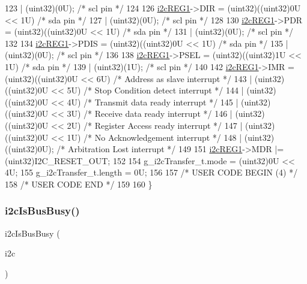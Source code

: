 \begin{DoxyCode}
123                   | (uint32)(0U);     \textcolor{comment}{/* scl pin */}
124 
126     \mbox{\hyperlink{reg__i2c_8h_a54937525fe89322407ede2bc3a5d0e4c}{i2cREG1}}->DIR  = (uint32)((uint32)0U << 1U)     \textcolor{comment}{/* sda pin */}
127                   | (uint32)(0U);     \textcolor{comment}{/* scl pin */}
128 
130     \mbox{\hyperlink{reg__i2c_8h_a54937525fe89322407ede2bc3a5d0e4c}{i2cREG1}}->PDR  = (uint32)((uint32)0U << 1U)     \textcolor{comment}{/* sda pin */}
131                   | (uint32)(0U);     \textcolor{comment}{/* scl pin */}
132 
134     \mbox{\hyperlink{reg__i2c_8h_a54937525fe89322407ede2bc3a5d0e4c}{i2cREG1}}->PDIS = (uint32)((uint32)0U << 1U)     \textcolor{comment}{/* sda pin */}
135                   | (uint32)(0U);     \textcolor{comment}{/* scl pin */}
136 
138     \mbox{\hyperlink{reg__i2c_8h_a54937525fe89322407ede2bc3a5d0e4c}{i2cREG1}}->PSEL = (uint32)((uint32)1U << 1U)     \textcolor{comment}{/* sda pin */}
139                   | (uint32)(1U);     \textcolor{comment}{/* scl pin */}
140 
142     \mbox{\hyperlink{reg__i2c_8h_a54937525fe89322407ede2bc3a5d0e4c}{i2cREG1}}->IMR  = (uint32)((uint32)0U << 6U)     \textcolor{comment}{/* Address as slave interrupt      */}
143                   | (uint32)((uint32)0U << 5U)     \textcolor{comment}{/* Stop Condition detect interrupt */}
144                   | (uint32)((uint32)0U << 4U)     \textcolor{comment}{/* Transmit data ready interrupt   */}
145                   | (uint32)((uint32)0U << 3U)     \textcolor{comment}{/* Receive data ready interrupt    */}
146                   | (uint32)((uint32)0U << 2U)     \textcolor{comment}{/* Register Access ready interrupt */}
147                   | (uint32)((uint32)0U << 1U)     \textcolor{comment}{/* No Acknowledgement interrupt    */}
148                   | (uint32)((uint32)0U);     \textcolor{comment}{/* Arbitration Lost interrupt      */}
149 
151     \mbox{\hyperlink{reg__i2c_8h_a54937525fe89322407ede2bc3a5d0e4c}{i2cREG1}}->MDR |= (uint32)I2C\_RESET\_OUT;
152 
154     g\_i2cTransfer\_t.mode   = (uint32)0U << 4U;
155     g\_i2cTransfer\_t.length = 0U;
156 
157 \textcolor{comment}{/* USER CODE BEGIN (4) */}
158 \textcolor{comment}{/* USER CODE END */}
159 
160 \}
\end{DoxyCode}
\mbox{\label{group__I2C_gad79e4ee925c6880eb644329b6701a292}} 
\subsubsection{\texorpdfstring{i2c\+Is\+Bus\+Busy()}{i2cIsBusBusy()}}
{\footnotesize\ttfamily i2c\+Is\+Bus\+Busy (\begin{DoxyParamCaption}\item[{\mbox{\hyperlink{reg__i2c_8h_a5d6c119fb20e803a530d0d4df544daf7}{i2c\+B\+A\+S\+E\+\_\+t}} $\ast$}]{i2c }\end{DoxyParamCaption})}



